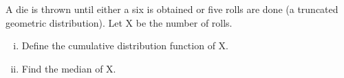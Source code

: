 	
	\item	A die is thrown until either a six is obtained or five rolls are done (a truncated geometric distribution). Let X be the number of rolls.
	\begin{enumerate}[(i)]
		\item 	Define the cumulative distribution function of X.
		\item	Find the median of X.
	\end{enumerate}	
	
